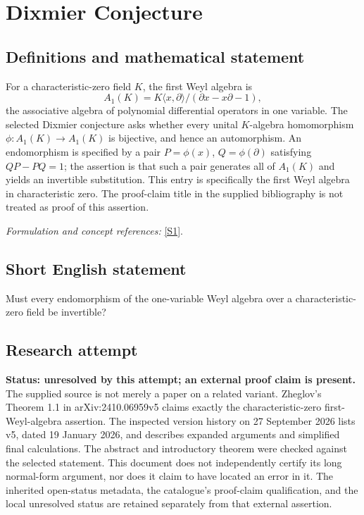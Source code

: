 \documentclass[11pt]{article}
\begin{document}
\section*{\texorpdfstring{Dixmier Conjecture}{Dixmier Conjecture}}\label{statement}
\subsection{Definitions and mathematical statement}
For a characteristic-zero field $K$, the first Weyl algebra is
\[
 A_1(K)=K\langle x,\partial\rangle/(\partial x-x\partial-1),
\]
the associative algebra of polynomial differential operators in one variable. The selected Dixmier conjecture asks whether every unital $K$-algebra homomorphism $\phi:A_1(K)\to A_1(K)$ is bijective, and hence an automorphism. An endomorphism is specified by a pair $P=\phi(x)$, $Q=\phi(\partial)$ satisfying $QP-PQ=1$; the assertion is that such a pair generates all of $A_1(K)$ and yields an invertible substitution. This entry is specifically the first Weyl algebra in characteristic zero. The proof-claim title in the supplied bibliography is not treated as proof of this assertion.
\par\smallskip\textit{Formulation and concept references:} \href{https://arxiv.org/abs/2410.06959}{[S1]}.

\subsection{Short English statement}
Must every endomorphism of the one-variable Weyl algebra over a characteristic-zero field be invertible?
\subsection{Research attempt}
\textbf{Status: unresolved by this attempt; an external proof claim is present.} The supplied source is not merely a paper on a related variant. Zheglov's Theorem 1.1 in arXiv:2410.06959v5 claims exactly the characteristic-zero first-Weyl-algebra assertion. The inspected version history on 27 September 2026 lists v5, dated 19 January 2026, and describes expanded arguments and simplified final calculations. The abstract and introductory theorem were checked against the selected statement. This document does not independently certify its long normal-form argument, nor does it claim to have located an error in it. The inherited open-status metadata, the catalogue's proof-claim qualification, and the local unresolved status are retained separately from that external assertion.
\end{document}
